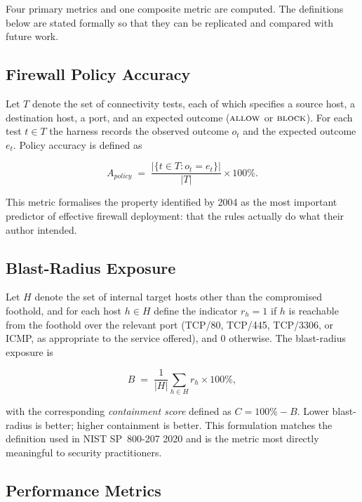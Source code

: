 Four primary metrics and one composite metric are computed. The definitions below are stated formally so that they can be replicated and compared with future work.

\subsection{Firewall Policy Accuracy}

Let $T$ denote the set of connectivity tests, each of which specifies a source host, a destination host, a port, and an expected outcome ($\textsc{allow}$ or $\textsc{block}$). For each test $t \in T$ the harness records the observed outcome $o_t$ and the expected outcome $e_t$. Policy accuracy is defined as

\begin{equation}
A_{\textit{policy}} \;=\; \frac{|\{t \in T : o_t = e_t\}|}{|T|} \times 100\%.
\label{eq:accuracy}
\end{equation}

This metric formalises the property identified by \textcite{Wool}{2004} as the most important predictor of effective firewall deployment: that the rules actually do what their author intended.

\subsection{Blast-Radius Exposure}

Let $H$ denote the set of internal target hosts other than the compromised foothold, and for each host $h \in H$ define the indicator $r_h = 1$ if $h$ is reachable from the foothold over the relevant port (TCP/80, TCP/445, TCP/3306, or ICMP, as appropriate to the service offered), and $0$ otherwise. The blast-radius exposure is

\begin{equation}
B \;=\; \frac{1}{|H|}\sum_{h \in H} r_h \times 100\%,
\label{eq:blast}
\end{equation}

with the corresponding \emph{containment score} defined as $C = 100\% - B$. Lower blast-radius is better; higher containment is better. This formulation matches the definition used in NIST SP~800-207 \parencite{Rose et al.}{2020} and is the metric most directly meaningful to security practitioners.

\subsection{Performance Metrics}

